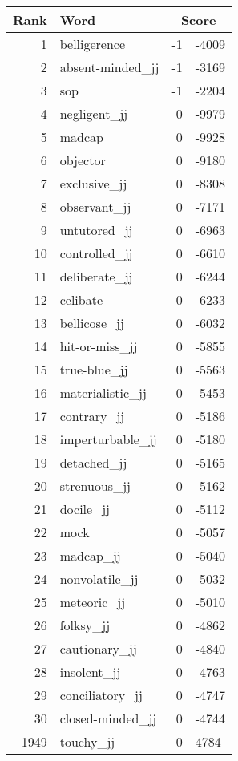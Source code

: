 \begin{longtable}[!htbp]{| rlr@{.}l |}
    \hline
    \textbf{Rank} & \textbf{Word} & \multicolumn{2}{c|}{\textbf{Score}} \\
    \hline
    \endhead
    1 & belligerence & -1 & -4009 \\
    2 & absent-minded\_jj & -1 & -3169 \\
    3 & sop & -1 & -2204 \\
    4 & negligent\_jj & 0 & -9979 \\
    5 & madcap & 0 & -9928 \\
    6 & objector & 0 & -9180 \\
    7 & exclusive\_jj & 0 & -8308 \\
    8 & observant\_jj & 0 & -7171 \\
    9 & untutored\_jj & 0 & -6963 \\
    10 & controlled\_jj & 0 & -6610 \\
    11 & deliberate\_jj & 0 & -6244 \\
    12 & celibate & 0 & -6233 \\
    13 & bellicose\_jj & 0 & -6032 \\
    14 & hit-or-miss\_jj & 0 & -5855 \\
    15 & true-blue\_jj & 0 & -5563 \\
    16 & materialistic\_jj & 0 & -5453 \\
    17 & contrary\_jj & 0 & -5186 \\
    18 & imperturbable\_jj & 0 & -5180 \\
    19 & detached\_jj & 0 & -5165 \\
    20 & strenuous\_jj & 0 & -5162 \\
    21 & docile\_jj & 0 & -5112 \\
    22 & mock & 0 & -5057 \\
    23 & madcap\_jj & 0 & -5040 \\
    24 & nonvolatile\_jj & 0 & -5032 \\
    25 & meteoric\_jj & 0 & -5010 \\
    26 & folksy\_jj & 0 & -4862 \\
    27 & cautionary\_jj & 0 & -4840 \\
    28 & insolent\_jj & 0 & -4763 \\
    29 & conciliatory\_jj & 0 & -4747 \\
    30 & closed-minded\_jj & 0 & -4744 \\
    1949 & touchy\_jj & 0 & 4784 \\

\end{longtable}
